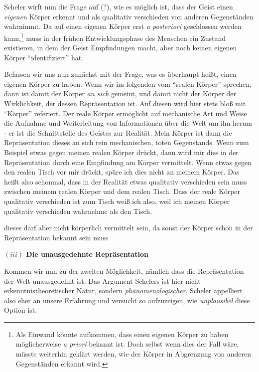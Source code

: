 \documentclass[a4paper, 12pt]{article}
\begin{document}
\begin{onehalfspace}
Scheler wirft nun die Frage auf (?), wie es möglich ist, dass der Geist einen \emph{eigenen} Körper erkennt und als qualitativ verschieden von anderen Gegenständen wahrnimmt. Da auf einen eigenen Körper erst \emph{a posteriori} geschlossen werden kann,\footnote{Als Einwand könnte aufkommen, dass einen eigenen Körper zu haben möglicherweise \emph{a priori} bekannt ist. Doch selbst wenn dies der Fall wäre, müsste weiterhin geklärt werden, wie der Körper in Abgrenzung von anderen Gegenständen erkannt wird.} muss in der frühen Entwicklungsphase des Menschen ein Zustand existieren, in dem der Geist Empfindungen macht, aber noch keinen eigenen Körper "`identifiziert"' hat. 

Befassen wir uns nun zunächst mit der Frage, was es überhaupt heißt, einen eigenen Körper zu haben. Wenn wir im folgenden vom "`realen Körper"' sprechen, dann ist damit der Körper \emph{an sich} gemeint, und damit nicht der Körper der Wirklichkeit, der dessen Repräsentation ist. Auf diesen wird hier stets bloß mit "`Körper"' referiert. Der reale Körper ermöglicht auf mechanische Art und Weise die Aufnahme und Weiterleitung von Informationen über die Welt um ihn herum - er ist die Schnittstelle des Geistes zur Realität. Mein Körper ist dann die Repräsentation dieses an sich rein mechanischen, toten Gegenstands. Wenn zum Beispiel etwas gegen meinen realen Körper drückt, dann wird mir dies in der Repräsentation durch eine Empfindung am Körper vermittelt. Wenn etwas gegen den realen Tisch vor mir drückt, spüre ich dies nicht an meinem Körper. Das heißt also schonmal, dass in der Realität etwas qualitativ verschieden sein muss zwischen meinem realen Körper und dem realen Tisch. Dass der reale Körper qualitativ verschieden ist zum Tisch weiß ich also, weil ich meinen Körper qualitativ verschieden wahrnehme als den Tisch. 


 dieses darf aber nicht körperlich vermittelt sein, da sonst der Körper schon in der Repräsentation bekannt sein muss





\vspace{5mm}
\noindent\textbf{$(iii)$ Die unausgedehnte Repräsentation}


\noindent Kommen wir nun zu der zweiten Möglichkeit, nämlich dass die Repräsentation der Welt unausgedehnt ist. Das Argument Schelers ist hier nicht erkenntnistheoretischer Natur, sondern \emph{phänomenologischer}. Scheler appelliert also eher an unsere Erfahrung und 	versucht so aufzuzeigen, wie \emph{unplausibel} diese Option ist.


\end{onehalfspace}
\end{document}
